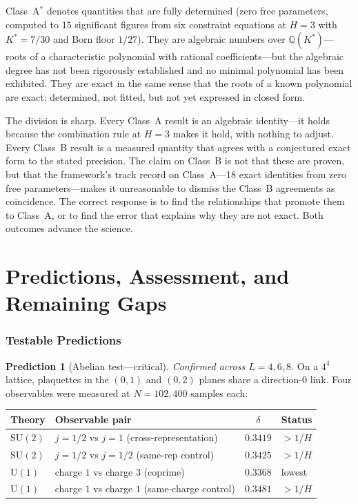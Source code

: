 \documentclass[11pt,a4paper]{article}
\theoremstyle{definition}
\theoremstyle{remark}
\newcommand{\SU}{\mathrm{SU}}
\begin{document}
\bigskip

Class~A$^*$ denotes quantities that are fully determined (zero free parameters, computed to $15$ significant figures from six constraint equations at $H=3$ with $K^*=7/30$ and Born floor $1/27$). They are algebraic numbers over $\mathbb{Q}(K^*)$---roots of a characteristic polynomial with rational coefficients---but the algebraic degree has not been rigorously established and no minimal polynomial has been exhibited. They are exact in the same sense that the roots of a known polynomial are exact: determined, not fitted, but not yet expressed in closed form.

The division is sharp. Every Class~A result is an algebraic identity---it holds because the combination rule at $H=3$ makes it hold, with nothing to adjust. Every Class~B result is a measured quantity that agrees with a conjectured exact form to the stated precision. The claim on Class~B is not that these are proven, but that the framework's track record on Class~A---18 exact identities from zero free parameters---makes it unreasonable to dismiss the Class~B agreements as coincidence. The correct response is to find the relationships that promote them to Class~A, or to find the error that explains why they are not exact. Both outcomes advance the science.


\part{Predictions, Assessment, and Remaining Gaps}\label{part:F}

\section{Testable Predictions}\label{sec:predictions}

\textbf{Prediction 1} (Abelian test---critical). \emph{Confirmed across $L=4,6,8$.} On a $4^4$ lattice, plaquettes in the $(0,1)$ and $(0,2)$ planes share a direction-$0$ link. Four observables were measured at $N=102{,}400$ samples each:

\begin{center}
\begin{tabular}{llcl}
\toprule
Theory & Observable pair & $\delta$ & Status \\
\midrule
$\SU(2)$ & $j\!=\!1/2$ vs $j\!=\!1$ (cross-representation) & $0.3419$ & $>\!1/H$ \\
$\SU(2)$ & $j\!=\!1/2$ vs $j\!=\!1/2$ (same-rep control) & $0.3425$ & $>\!1/H$ \\
$\mathrm{U}(1)$ & charge $1$ vs charge $3$ (coprime) & $0.3368$ & lowest \\
$\mathrm{U}(1)$ & charge $1$ vs charge $1$ (same-charge control) & $0.3481$ & $>\!1/H$ \\
\bottomrule
\end{tabular}
\end{center}
\end{document}
